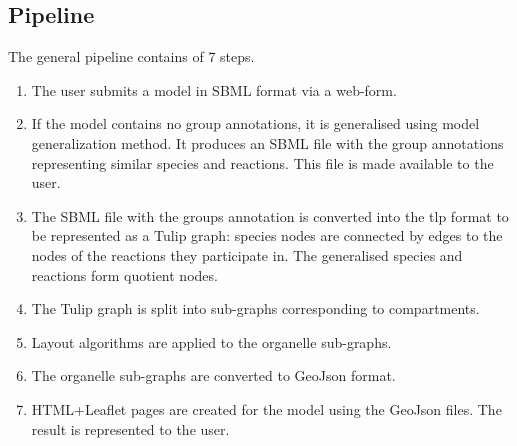 \documentclass{bioinfo}
\begin{document}
\subsection*{Pipeline}
The general pipeline contains of 7 steps.
\begin{enumerate}
\item The user submits a model in SBML format via a web-form.
\item If the model contains no group annotations, it is generalised using model generalization method. It produces an SBML file with the group annotations representing similar species and reactions. This file is made available to the user.
\item The SBML file with the groups annotation is converted into the tlp format to be represented as a Tulip graph: species nodes are connected by edges to the nodes of the reactions they participate in. The generalised species and reactions form quotient nodes.
\item The Tulip graph is split into sub-graphs corresponding to compartments.
\item Layout algorithms are applied to the organelle sub-graphs.
\item The organelle sub-graphs are converted to GeoJson format.
\item HTML+Leaflet pages are created for the model using the GeoJson files. The result is represented to the user.
\end{enumerate}
\end{document}
